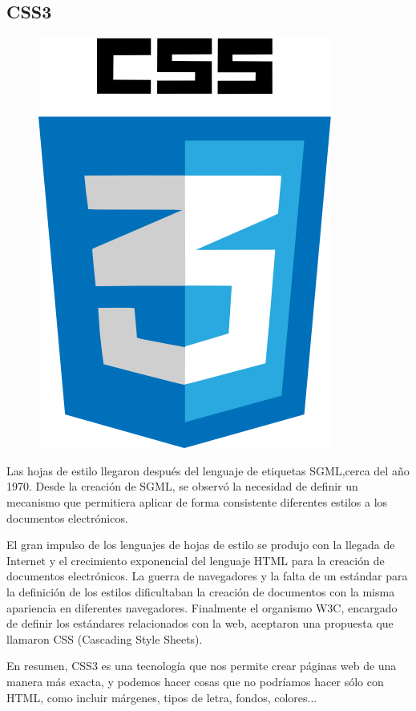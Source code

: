 \documentclass[a4paper, 12pt]{book}
\begin{document}
\subsection{CSS3}
\begin{figure}[hbtp]
\centering
\includegraphics[scale=0.35]{img/CSS3.png} 
\end{figure}

Las hojas de estilo llegaron después del lenguaje de etiquetas SGML,cerca del año 1970. Desde la creación de SGML, se observó la necesidad de definir un mecanismo que permitiera aplicar de forma consistente diferentes estilos a los documentos electrónicos.

El gran impulso de los lenguajes de hojas de estilo se produjo con la llegada de Internet y el crecimiento exponencial del lenguaje HTML para la creación de documentos electrónicos. La guerra de navegadores y la falta de un estándar para la definición de los estilos dificultaban la creación de documentos con la misma apariencia en diferentes navegadores. Finalmente el organismo W3C, encargado de definir los estándares relacionados con la web, aceptaron una propuesta que llamaron CSS (Cascading Style Sheets).

En resumen, CSS3 es una tecnología que nos permite crear páginas web de una manera más exacta, y podemos hacer cosas que no podríamos hacer sólo con HTML, como incluir márgenes, tipos de letra, fondos, colores...
\\
\end{document}
